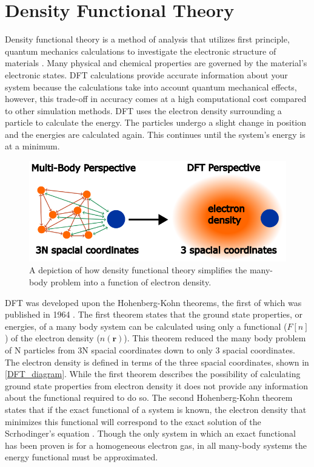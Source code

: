 \section{Density Functional Theory}
Density functional theory is a method of analysis that utilizes first principle, quantum mechanics calculations to investigate the electronic structure of materials \citep{baseden_introduction_2014,paul_true_2019}. Many physical and chemical properties are governed by the material's electronic states. DFT calculations provide accurate information about your system because the calculations take into account quantum mechanical effects, however, this trade-off in accuracy comes at a high computational cost compared to other simulation methods. DFT uses the electron density surrounding a particle to calculate the energy. The particles undergo a slight change in position and the energies are calculated again. This continues until the system's energy is at a minimum. 

\begin{figure}
    \centering
    \includegraphics[width=12cm]{src/figures/intro_figs/dft_diagram.png}
    \caption{A depiction of how density functional theory simplifies the many-body problem into a function of electron density. }
    \label{DFT_diagram}
\end{figure}

DFT was developed upon the Hohenberg-Kohn theorems, the first of which was published in 1964 \citep{hohenberg_inhomogeneous_1964}. The first theorem states that the ground state properties, or energies, of a many body system can be calculated using only a functional ($F[n]$) of the electron density ($n(\textbf{r})$). This theorem reduced the many body problem of N particles from 3N spacial coordinates down to only 3 spacial coordinates. The electron density is defined in terms of the three spacial coordinates, shown in \autoref{DFT_diagram}. While the first theorem describes the possibility of calculating ground state properties from electron density it does not provide any information about the functional required to do so. The second Hohenberg-Kohn theorem states that if the exact functional of a system is known, the electron density that minimizes this functional will correspond to the exact solution of the Scrhodinger's equation \citep{kohn_self-consistent_1965}. Though the only system in which an exact functional has been proven is for a homogeneous electron gas, in all many-body systems the energy functional must be approximated. 
